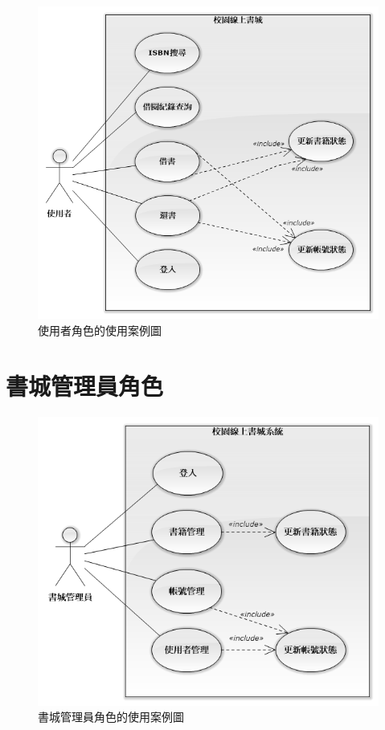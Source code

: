 \begin{figure}[ht]
    \centering
    \includegraphics[width=\linewidth]{image/使用案例：使用者.png}
    \captionsetup{justification=centering}
    \caption{使用者角色的使用案例圖}
\end{figure}

\clearpage

\section{書城管理員角色}

\begin{figure}[ht]
    \centering
    \includegraphics[width=\linewidth]{image/使用案例：書城管理員.png}
    \captionsetup{justification=centering}
    \caption{書城管理員角色的使用案例圖}
\end{figure}
